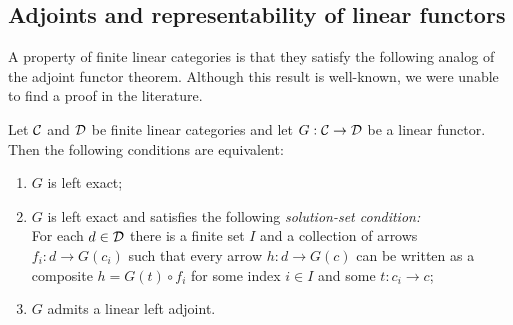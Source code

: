 \documentclass{amsart}
\begin{document}
\subsection{Adjoints and representability of linear functors}

A property of finite linear categories is that they satisfy the following analog of the adjoint functor theorem.  Although this result is well-known, we were unable to find a proof in the literature.  

\begin{proposition} \label{prop:AFT}
	Let $\mathcal C$ and $\mathcal D$ be finite linear categories and let $G: \mathcal C \rightarrow \mathcal D$  be a linear functor. Then the following conditions are equivalent: 
	\begin{enumerate}
		\item $G$ is left exact;  
		\item $G$ is left exact and satisfies the following {\em solution-set condition:} \\  For each $d \in \mathcal D$ there is a finite set $I$ and a collection of arrows $f_i:d \to G(c_i)$ such that every arrow $h:d \to G(c)$ can be written as a composite $h = G(t) \circ f_i$ for some index $i \in I$ and some $t: c_i \to c$; 
		\item $G$ admits a linear left adjoint.
	\end{enumerate}
\end{proposition}
\end{document}
